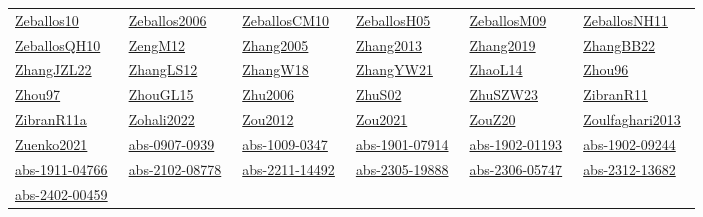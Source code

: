\begin{longtable}{*{6}{l}}
\href{../works/Zeballos10.pdf}{Zeballos10}~\cite{Zeballos10} & \href{../}{Zeballos2006}~\cite{Zeballos2006} & \href{../works/ZeballosCM10.pdf}{ZeballosCM10}~\cite{ZeballosCM10} & \href{../works/ZeballosH05.pdf}{ZeballosH05}~\cite{ZeballosH05} & \href{../works/ZeballosM09.pdf}{ZeballosM09}~\cite{ZeballosM09} & \href{../works/ZeballosNH11.pdf}{ZeballosNH11}~\cite{ZeballosNH11}\\ 
\href{../works/ZeballosQH10.pdf}{ZeballosQH10}~\cite{ZeballosQH10} & \href{../works/ZengM12.pdf}{ZengM12}~\cite{ZengM12} & \href{../}{Zhang2005}~\cite{Zhang2005} & \href{../}{Zhang2013}~\cite{Zhang2013} & \href{../}{Zhang2019}~\cite{Zhang2019} & \href{../works/ZhangBB22.pdf}{ZhangBB22}~\cite{ZhangBB22}\\ 
\href{../works/ZhangJZL22.pdf}{ZhangJZL22}~\cite{ZhangJZL22} & \href{../works/ZhangLS12.pdf}{ZhangLS12}~\cite{ZhangLS12} & \href{../works/ZhangW18.pdf}{ZhangW18}~\cite{ZhangW18} & \href{../works/ZhangYW21.pdf}{ZhangYW21}~\cite{ZhangYW21} & \href{../works/ZhaoL14.pdf}{ZhaoL14}~\cite{ZhaoL14} & \href{../works/Zhou96.pdf}{Zhou96}~\cite{Zhou96}\\ 
\href{../works/Zhou97.pdf}{Zhou97}~\cite{Zhou97} & \href{../works/ZhouGL15.pdf}{ZhouGL15}~\cite{ZhouGL15} & \href{../}{Zhu2006}~\cite{Zhu2006} & \href{../works/ZhuS02.pdf}{ZhuS02}~\cite{ZhuS02} & \href{../works/ZhuSZW23.pdf}{ZhuSZW23}~\cite{ZhuSZW23} & \href{../works/ZibranR11.pdf}{ZibranR11}~\cite{ZibranR11}\\ 
\href{../works/ZibranR11a.pdf}{ZibranR11a}~\cite{ZibranR11a} & \href{../}{Zohali2022}~\cite{Zohali2022} & \href{../}{Zou2012}~\cite{Zou2012} & \href{../}{Zou2021}~\cite{Zou2021} & \href{../works/ZouZ20.pdf}{ZouZ20}~\cite{ZouZ20} & \href{../}{Zoulfaghari2013}~\cite{Zoulfaghari2013}\\ 
\href{../}{Zuenko2021}~\cite{Zuenko2021} & \href{../works/abs-0907-0939.pdf}{abs-0907-0939}~\cite{abs-0907-0939} & \href{../works/abs-1009-0347.pdf}{abs-1009-0347}~\cite{abs-1009-0347} & \href{../works/abs-1901-07914.pdf}{abs-1901-07914}~\cite{abs-1901-07914} & \href{../works/abs-1902-01193.pdf}{abs-1902-01193}~\cite{abs-1902-01193} & \href{../works/abs-1902-09244.pdf}{abs-1902-09244}~\cite{abs-1902-09244}\\ 
\href{../works/abs-1911-04766.pdf}{abs-1911-04766}~\cite{abs-1911-04766} & \href{../works/abs-2102-08778.pdf}{abs-2102-08778}~\cite{abs-2102-08778} & \href{../works/abs-2211-14492.pdf}{abs-2211-14492}~\cite{abs-2211-14492} & \href{../works/abs-2305-19888.pdf}{abs-2305-19888}~\cite{abs-2305-19888} & \href{../works/abs-2306-05747.pdf}{abs-2306-05747}~\cite{abs-2306-05747} & \href{../works/abs-2312-13682.pdf}{abs-2312-13682}~\cite{abs-2312-13682}\\ 
\href{../works/abs-2402-00459.pdf}{abs-2402-00459}~\cite{abs-2402-00459} & \end{longtable}
